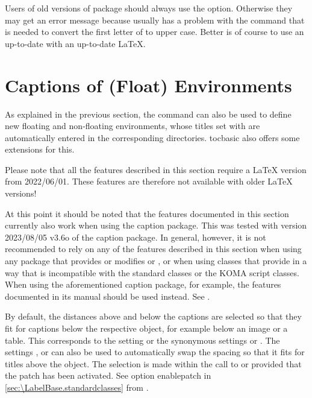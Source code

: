 Users of old versions of package  should always use the
 option.  Otherwise they may get an error message because
 usually has a problem with the
 command that is needed to
convert the first letter of  to upper case. Better is of course
to use an up-to-date  with an up-to-date \LaTeX.%
\EndIndexGroup

\section{Captions of (Float) Environments}

As explained in the previous section, the
 command can also be used to define new
floating and non-floating environments, whose titles set with
 are automatically entered in the
corresponding directories. tocbasic also offers some extensions for this.

Please note that all the features described in this section require a
\LaTeX{} version from 2022/06/01. These features
are therefore not available with older LaTeX versions!

%
At this point it should be noted that the features documented in this section
currently also work when using the caption package. This was tested with
version 2023/08/05 v3.6o of the caption package. In general, however, it is
not recommended to rely on any of the features described in this section when
using any package that provides or modifies 
or , or when using classes that provide
 in a way that is incompatible with the
standard classes or the KOMA script classes. When using the aforementioned
caption package, for example, the features documented in its manual should be
used instead. See \cite{package:caption.engl}.

\begin{Declaration}
\end{Declaration}
By default, the distances above and below the captions are selected so that
they fit for captions below the respective object, for example below an image
or a table. This corresponds to the setting
 or the synonymous settings
 or . The
settings , 
or  can also be used to automatically swap
the spacing so that it fits for titles above the object. The selection is made
within the call to  or
 provided that the
 patch has been activated. See option
enablepatch in \autoref{sec:\LabelBase.standardclasses} from
.

